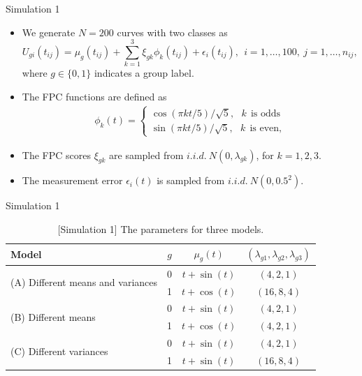 \documentclass{beamer}
\begin{document}
\begin{frame}{Simulation 1}
	\begin{itemize}
		\item{
			We generate $N=200$ curves with two classes as 
			$$U_{gi}(t_{ij} ) = \mu_g(t_{ij} ) + \sum_{k=1}^3 \xi_{gk} \phi_k(t_{ij} ) + \epsilon_i(t_{ij} ),~~i=1, \ldots , 100, ~j=1, \ldots, n_{ij},$$
			where $g \in \{ 0,  1\}$ indicates a group label.
		}
		\item{
			The FPC functions are defined as
			\begin{eqnarray}
			\phi_k(t)=  \begin{cases}
			\cos(\pi kt /5) / \sqrt{5},~~ ~ k ~~\text{is odds}\\
			\sin(\pi kt /5) / \sqrt{5},~~ ~ k ~~\text{is even,}
			\end{cases}\label{sim1}
			\end{eqnarray}
		}
		\item{
			The FPC scores $\xi_{gk}$ are sampled from $i.i.d. \ N(0, \lambda_{gk})$, for $k=1,2,3$.
		}
		\item{
			The measurement error $\epsilon_i(t)$ is sampled from $i.i.d. \ N(0, 0.5^2)$.
		}
	\end{itemize}
\end{frame}

\begin{frame}{Simulation 1}
	\begin{table}[h!]
		\footnotesize
		\centering
		\caption{[Simulation 1] The parameters for three models.}\label{t1}
		\tabcolsep=11.5pt
		\begin{tabular}{lccc}
			\hline 
			Model & $g$ & $\mu_g(t)$ & $ (\lambda_{g1} ,\lambda_{g2},\lambda_{g3}) $ \\ 
			\hline
			\multirow{2}{*}{(A) Different means and variances} & 0 & $t + \sin(t)$ & $(4, 2, 1)$ \\
			& 1 & $t + \cos(t)$ & $(16, 8, 4)$ \\
			\hline
			\multirow{2}{*}{(B) Different means } & 0 & $t + \sin(t)$ & $(4, 2, 1)$ \\
			& 1 & $t + \cos(t)$ & $(4, 2, 1)$ \\
			\hline
			\multirow{2}{*}{(C) Different variances} & 0 & $t + \sin(t)$ & $(4, 2, 1)$ \\
			& 1 & $t + \sin(t)$ & $(16, 8, 4)$ \\
			\hline 
		\end{tabular}
	\end{table}
\end{frame}
\end{document}
